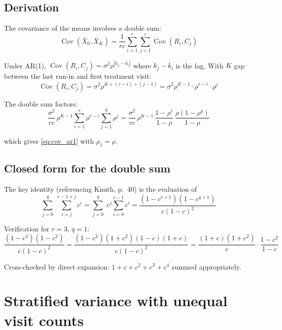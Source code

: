 \documentclass[11pt]{article}
\DeclareMathOperator{\Cov}{Cov}
\begin{document}
\subsection{Derivation}

The covariance of the means involves a double sum:
\begin{equation}
  \Cov(\bar{X}_0, \bar{X}_K)
  = \frac{1}{rc}\sum_{i=1}^{r}\sum_{j=1}^{c}
    \Cov(R_i, C_j)
\end{equation}

Under AR(1), $\Cov(R_i, C_j) = \sigma^2 \rho^{|k_j - k_i|}$
where $k_j - k_i$ is the lag. With $K$ gap between the
last run-in and first treatment visit:
\begin{equation}
  \Cov(R_i, C_j) = \sigma^2 \rho^{K + (r - i) + (j - 1)}
  = \sigma^2 \rho^{K-1} \cdot \rho^{r-i} \cdot \rho^{j}
\end{equation}

The double sum factors:
\begin{equation}
  \frac{\sigma^2}{rc}\, \rho^{K-1}
    \sum_{i=1}^{r} \rho^{r-i}
    \sum_{j=1}^{q} \rho^{j}
  = \frac{\sigma^2}{rc}\, \rho^{K-1}\,
    \frac{1 - \rho^r}{1 - \rho}\,
    \frac{\rho(1 - \rho^q)}{1 - \rho}
\end{equation}

which gives \eqref{eq:cov_ar1} with $\rho_1 = \rho$.

\subsection{Closed form for the double sum}

The key identity (referencing Knuth, p.\ 40) is the
evaluation of
\begin{equation}
  \sum_{j=0}^{q}\;\sum_{i=j}^{r-1+j} c^i
  = \sum_{j=0}^{q}\; c^j \sum_{i=0}^{r-1} c^i
  = \frac{(1 - c^{r+1})(1 - c^{q+1})}{c(1-c)^2}
  \label{eq:double_sum}
\end{equation}

Verification for $r = 3$, $q = 1$:
\begin{equation}
  \frac{(1 - c^4)(1 - c^2)}{c(1-c)^2}
  = \frac{(1-c^2)(1+c^2)(1-c)(1+c)}{c(1-c)^2}
  = \frac{(1+c)(1+c^2)}{c} \cdot \frac{1-c^2}{1-c}
\end{equation}

Cross-checked by direct expansion:
$1 + c + c^2 + c^3 + c^4$ summed appropriately.


\section{Stratified variance with unequal visit counts}
\label{sec:stratified}
\end{document}
